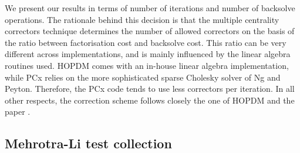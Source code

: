 
We present our results in terms of number of iterations and number 
of backsolve operations. The rationale behind this decision is that 
the multiple centrality correctors technique determines the number 
of allowed correctors on the basis of the ratio between factorisation 
cost and backsolve cost. This ratio can be very different across 
implementations, and is mainly influenced by the linear algebra 
routines used. 
HOPDM comes with an in-house linear algebra implementation, while
PCx relies on the more sophisticated sparse Cholesky solver
of Ng and Peyton. Therefore, the PCx code tends to use less 
correctors per iteration.
In all other respects, the correction scheme follows closely the one
of HOPDM and the paper \cite{Gondzio96}.

%
%
\subsection{Mehrotra-Li test collection}
\label{ML-tests}

